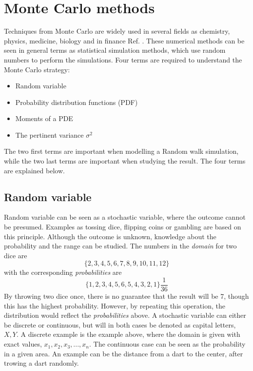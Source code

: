 \documentclass[%
twoside,                 %
final,                   %
chapterprefix=true,      %
open=right               %
10pt]{book}
\begin{document}
\section{Monte Carlo methods}
\label{sec:monte_carlo_methods}
Techniques from Monte Carlo are widely used in several fields as chemistry, physics, medicine, biology and in finance Ref. \cite{hjorth2011computational}. These numerical methods can be seen in general terms as statistical simulation methods, which use random numbers to perform the simulations. Four terms are required to understand the Monte Carlo strategy:
\begin{itemize}
\item Random variable

\item Probability distribution functions (PDF)

\item Moments of a PDE

\item The pertinent variance $\sigma ^2$
\end{itemize}

\noindent
The two first terms are important when modelling a Random walk simulation, while the two last terms are important when studying the result. The four terms are explained below.

\subsection{Random variable}
Random variable can be seen as a stochastic variable, where the outcome cannot be presumed. Examples as tossing dice, flipping coins or gambling are based on this principle. Although the outcome is unknown, knowledge about the probability and the range can be studied. The numbers in the \emph{domain} for two dice are
\begin{equation*}
\{2,3,4,5,6,7,8,9,10,11,12\}
\end{equation*}
with the corresponding \emph{probabilities} are
\begin{equation*}
\{1,2,3,4,5,6,5,4,3,2,1\}\frac{1}{36}
\end{equation*}
By throwing two dice once, there is no guarantee that the result will be 7, though this has the highest probability. However, by repeating this operation, the distribution would reflect the \emph{probabilities} above. A stochastic variable can either be discrete or continuous, but will in both cases be denoted as capital letters, $X,Y$. A discrete example is the example above, where the domain is given with exact values, ${x_1,x_2,x_3,...,x_n}$. The continuous case can be seen as the probability in a given area. An example can be the distance from a dart to the center, after trowing a dart randomly.
\end{document}

